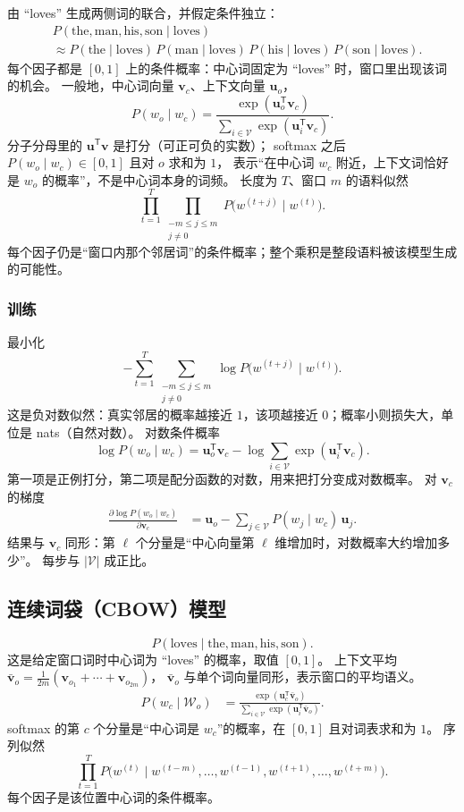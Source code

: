 由 “loves” 生成两侧词的联合，并假定条件独立：
\begin{align*}
&P(\text{the},\text{man},\text{his},\text{son}\mid\text{loves})
\\
&\approx
P(\text{the}\mid\text{loves})\,P(\text{man}\mid\text{loves})
\,P(\text{his}\mid\text{loves})\,P(\text{son}\mid\text{loves}).
\end{align*}
每个因子都是 $[0,1]$ 上的条件概率：中心词固定为 “loves” 时，窗口里出现该词的机会。
一般地，中心词向量 $\bm{v}_c$、上下文向量 $\bm{u}_o$，
\[
P(w_o\mid w_c)
=
\frac{\exp(\bm{u}_o^{\mathsf T}\bm{v}_c)}{\sum_{i\in\mathcal{V}}\exp(\bm{u}_i^{\mathsf T}\bm{v}_c)}.
\]
分子分母里的 $\bm{u}^{\mathsf T}\bm{v}$ 是打分（可正可负的实数）；
softmax 之后 $P(w_o\mid w_c)\in[0,1]$ 且对 $o$ 求和为 $1$，
表示“在中心词 $w_c$ 附近，上下文词恰好是 $w_o$ 的概率”，不是中心词本身的词频。
长度为 $T$、窗口 $m$ 的语料似然
\[
\prod_{t=1}^{T}
\prod_{\substack{-m\leq j\leq m\\ j\neq 0}}
P\bigl(w^{(t+j)}\mid w^{(t)}\bigr).
\]
每个因子仍是“窗口内那个邻居词”的条件概率；整个乘积是整段语料被该模型生成的可能性。

\subsubsection{训练}

最小化
\[
-\sum_{t=1}^{T}
\sum_{\substack{-m\leq j\leq m\\ j\neq 0}}
\log P\bigl(w^{(t+j)}\mid w^{(t)}\bigr).
\]
这是负对数似然：真实邻居的概率越接近 $1$，该项越接近 $0$；概率小则损失大，单位是 nats（自然对数）。
对数条件概率
\[
\log P(w_o\mid w_c)
=
\bm{u}_o^{\mathsf T}\bm{v}_c
-\log\sum_{i\in\mathcal{V}}\exp(\bm{u}_i^{\mathsf T}\bm{v}_c).
\]
第一项是正例打分，第二项是配分函数的对数，用来把打分变成对数概率。
对 $\bm{v}_c$ 的梯度
\begin{align*}
\frac{\partial\log P(w_o\mid w_c)}{\partial\bm{v}_c}
&=
\bm{u}_o
-\sum_{j\in\mathcal{V}}P(w_j\mid w_c)\,\bm{u}_j.
\end{align*}
结果与 $\bm{v}_c$ 同形：第 $\ell$ 个分量是“中心向量第 $\ell$ 维增加时，对数概率大约增加多少”。
每步与 $|\mathcal{V}|$ 成正比。

\subsection{连续词袋（CBOW）模型}

\[
P(\text{loves}\mid\text{the},\text{man},\text{his},\text{son}).
\]
这是给定窗口词时中心词为 “loves” 的概率，取值 $[0,1]$。
上下文平均 $\bar{\bm{v}}_o=\frac1{2m}(\bm{v}_{o_1}+\cdots+\bm{v}_{o_{2m}})$，
$\bar{\bm{v}}_o$ 与单个词向量同形，表示窗口的平均语义。
\begin{align*}
P(w_c\mid\mathcal{W}_o)
&=
\frac{\exp(\bm{u}_c^{\mathsf T}\bar{\bm{v}}_o)}
{\sum_{i\in\mathcal{V}}\exp(\bm{u}_i^{\mathsf T}\bar{\bm{v}}_o)}.
\end{align*}
softmax 的第 $c$ 个分量是“中心词是 $w_c$”的概率，在 $[0,1]$ 且对词表求和为 $1$。
序列似然
\[
\prod_{t=1}^{T}
P\bigl(w^{(t)}\mid w^{(t-m)},\ldots,w^{(t-1)},w^{(t+1)},\ldots,w^{(t+m)}\bigr).
\]
每个因子是该位置中心词的条件概率。

